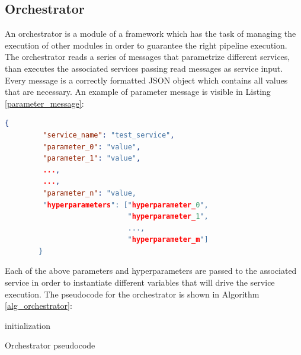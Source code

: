\documentclass[\main/main.tex]{subfiles}
\begin{document}
\subsection{Orchestrator}
An orchestrator is a module of a framework which has the task of managing the execution of other modules in order to guarantee the right pipeline execution. The orchestrator reads a series of messages that parametrize different services, than executes the associated services passing read messages as service input. Every message is a correctly formatted JSON object which contains all values that are necessary. An example of parameter message is visible in Listing \ref{parameter_message}:
\\
\begin{center}
    \begin{lstlisting}[language=json, caption="Parameter message example", captionpos=b, label={parameter_message}]
        {
         "service_name": "test_service",
         "parameter_0": "value",
         "parameter_1": "value",
         ...,
         ...,
         "parameter_n": "value,
         "hyperparameters": ["hyperparameter_0", 
                             "hyperparameter_1", 
                             ..., 
                             "hyperparameter_m"]
        }
    \end{lstlisting}
\end{center}

Each of the above parameters and hyperparameters are passed to the associated service in order to instantiate different variables that will drive the service execution.
The pseudocode for the orchestrator is shown in Algorithm \ref{alg_orchestrator}:
\begin{center}
    \begin{algorithm}[H]
     initialization\;
    \caption{Orchestrator pseudocode}
    \label{alg_orchestrator}
    \end{algorithm}
    
\end{center}
\end{document}

